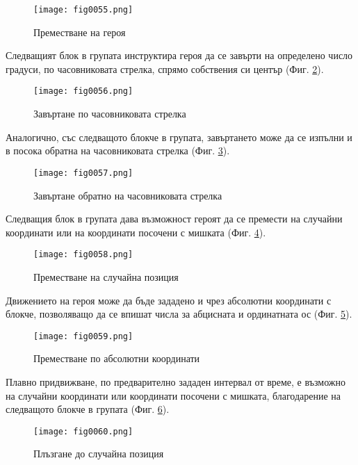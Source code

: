 \begin{figure}[H]
  \centering
  \texttt{[image: fig0055.png]}
  \caption{Преместване на героя}
\label{fig0055}
\end{figure}

Следващият блок в групата инструктира героя да се завърти на определено число градуси, по часовниковата стрелка, спрямо собствения си център (Фиг. \ref{fig0056}).

\begin{figure}[H]
  \centering
  \texttt{[image: fig0056.png]}
  \caption{Завъртане по часовниковата стрелка}
\label{fig0056}
\end{figure}

Аналогично, със следващото блокче в групата, завъртането може да се изпълни и в посока обратна на часовниковата стрелка (Фиг. \ref{fig0057}).

\begin{figure}[H]
  \centering
  \texttt{[image: fig0057.png]}
  \caption{Завъртане обратно на часовниковата стрелка}
\label{fig0057}
\end{figure}

Следващия блок в групата дава възможност героят да се премести на случайни координати или на координати посочени с мишката (Фиг. \ref{fig0058}).

\begin{figure}[H]
  \centering
  \texttt{[image: fig0058.png]}
  \caption{Преместване на случайна позиция}
\label{fig0058}
\end{figure}

Движението на героя може да бъде зададено и чрез абсолютни координати с блокче, позволяващо да се впишат числа за абцисната и ординатната ос (Фиг. \ref{fig0059}).

\begin{figure}[H]
  \centering
  \texttt{[image: fig0059.png]}
  \caption{Преместване по абсолютни координати}
\label{fig0059}
\end{figure}

Плавно придвижване, по предварително зададен интервал от време, е възможно на случайни координати или координати посочени с мишката, благодарение на следващото блокче в групата (Фиг. \ref{fig0060}).

\begin{figure}[H]
  \centering
  \texttt{[image: fig0060.png]}
  \caption{Плъзгане до случайна позиция}
\label{fig0060}
\end{figure}

